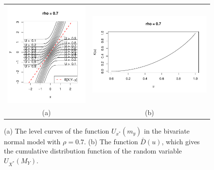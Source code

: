 \documentclass[twoside,11pt]{article}
\begin{document}
\begin{figure}[h]
\centering
\begin{tabular}{cc}
\includegraphics[scale = 0.6, clip = true, trim = 0.1in 0 0 0.8in]{illus_ufunc_0_7.pdf} &
\includegraphics[scale = 0.65, clip = true, trim = 0 -0.3in 0 0.5in]{illus_kfunc_0_7.pdf}\\
(a) & (b)
\end{tabular}

\caption{
(a) The level curves of the function $U_{x^*}(m_y)$ in the bivariate normal model with $\rho = 0.7$.
(b) The function $\bar{D}(u)$, which gives the cumulative distribution function of the random variable $U_{X^*}(M_Y)$.}\label{fig:toy3}
\end{figure}
\end{document}
